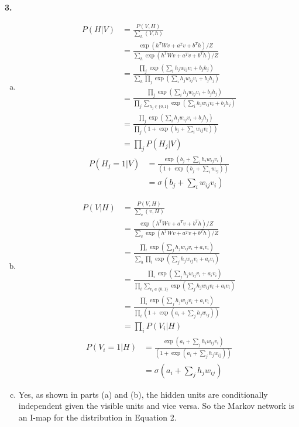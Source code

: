 \documentclass{article}
\begin{document}
\textbf{3.} \begin{enumerate}[(a)]
    \item \begin{align*}
        P(H | V) &= \frac{P(V, H)}{\sum_h (V, h)} \\
        &= \frac{\exp(h^TWv + a^Tv + b^Th)/Z}{\sum_h \exp(h^TWv + a^Tv + b^Th)/Z} \\[0.5ex]
        &= \frac{\prod_j \exp(\sum_i h_j w_{ij}v_i + b_jh_j)}{\sum_{h} \prod_j \exp(\sum_i h_j w_{ij}v_i + b_jh_j)} \\[0.5ex]
        &= \frac{\prod_j \exp(\sum_i h_j w_{ij}v_i + b_jh_j)}{\prod_j \sum_{h_j \in \{0, 1\}}\exp(\sum_i h_j w_{ij}v_i + b_jh_j)} \\[0.5ex]
        &= \frac{\prod_j \exp(\sum_i h_j w_{ij}v_i + b_jh_j)}{\prod_j (1 + \exp(b_j + \sum_i w_{ij}v_i))} \\[0.5ex]
        &= \prod_j P(H_j | V)
    \end{align*}
    \begin{align*}
        P(H_j = 1 | V) &= \frac{\exp( b_j + \sum_i h_i w_{ij}v_i)}{(1 + \exp(b_j + \sum_i w_{ij}))} \\[0.5ex]
        &= \sigma(b_j + \sum_{i} w_{ij}v_i)
    \end{align*}
    \item \begin{align*}
        P(V | H) &= \frac{P(V, H)}{\sum_v (v, H)} \\
        &= \frac{\exp(h^TWv + a^Tv + b^Th)/Z}{\sum_v \exp(h^TWv + a^Tv + b^Th)/Z} \\[0.5ex]
        &= \frac{\prod_i \exp(\sum_j h_j w_{ij}v_i + a_iv_i)}{\sum_{h} \prod_i \exp(\sum_j h_j w_{ij}v_i + a_iv_i)} \\[0.5ex]
        &= \frac{\prod_i \exp(\sum_j h_j w_{ij}v_i + a_iv_i)}{\prod_i \sum_{v_i \in \{0, 1\}}\exp(\sum_j h_j w_{ij}v_i + a_iv_i)} \\[0.5ex]
        &= \frac{\prod_i \exp(\sum_j h_j w_{ij}v_i + a_iv_i)}{\prod_i (1 + \exp(a_i + \sum_j h_jw_{ij}))} \\[0.5ex]
        &= \prod_i P(V_i| H)
    \end{align*}
    \begin{align*}
        P(V_i = 1 | H) &= \frac{\exp(a_i + \sum_j h_i w_{ij}v_i)}{(1 + \exp(a_i + \sum_j h_jw_{ij}))} \\[0.5ex]
        &= \sigma(a_i + \sum_{j} h_jw_{ij})
    \end{align*}
    \item Yes, as shown in parts (a) and (b), the hidden units are conditionally independent given the visible units and vice versa. So the Markov network is an I-map for the distribution in Equation 2.

\end{enumerate}
\end{document}
